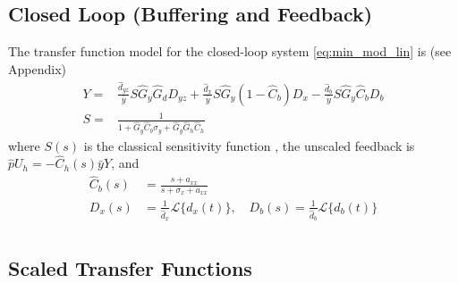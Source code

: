 \documentclass[letterpaper, 10 pt,  conference]{ieeeconf}  %
\begin{document}
\subsection{Closed Loop (Buffering and Feedback)}

The transfer function model for the closed-loop system \eqref{eq:min_mod_lin} is (see Appendix)
\begin{equation}\label{eq:cl_tf_par}
\begin{aligned}
Y=&\frac{\hat d_{yz}}{\bar{y}}S\hat G_y\hat G_dD_{yz}+\frac{\hat d_x}{\bar{y}}S\hat G_y(1-\hat C_b)D_x-\frac{\hat d_b}{\bar{y}}S\hat G_y\hat C_bD_b\\
S=&\frac{1}{1+\hat G_y\hat C_b\sigma_y+\hat G_y\hat G_h\hat C_h}
\end{aligned} 
\end{equation}
where $S(s)$ is the classical sensitivity function \cite{SKOP05}, the unscaled feedback is $\hat{p}U_h=-\hat C_h(s)\bar{y}Y$, and
\begin{equation*}
\begin{aligned}
\hat C_b(s)&= \frac{s+a_{xx}}{s+\sigma_x+a_{xx}}\\
D_x(s)&=\frac{1}{\hat d_x}\mathcal{L}\{d_x(t)\}, \quad D_b(s)=\frac{1}{\hat d_b}\mathcal{L}\{d_b(t)\}\\
\end{aligned}
\end{equation*}


\subsection{Scaled Transfer Functions}
\end{document}
